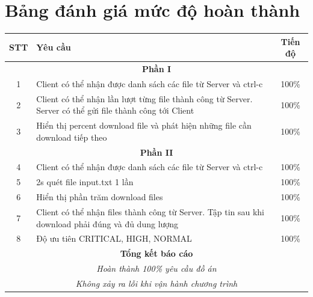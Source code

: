 \documentclass[a4paper,12pt]{report}
\begin{document}
\section{Bảng đánh giá mức độ hoàn thành}
\begin{center}
  \renewcommand{\arraystretch}{1.5}
  \begin{tabular}{|c|p{}|c|}
    \hline
    \textbf{STT} & \textbf{Yêu cầu}                                                                                         & \textbf{Tiến độ} \\\hline
    \multicolumn{3}{|c|}{\textbf{Phần I}}                                                                                                      \\\hline
    1            & Client có thể nhận được danh sách các file từ Server và ctrl-c                                           & 100\%            \\\hline
    2            & Client có thể nhận lần lượt từng file thành công từ Server. Server có thể gửi file thành công tới Client & 100\%            \\\hline
    3            & Hiển thị percent download file và phát hiện những file cần download tiếp theo                            & 100\%            \\\hline
    \multicolumn{3}{|c|}{\textbf{Phần II}}                                                                                                     \\\hline
    4            & Client có thể nhận được danh sách các file từ Server và ctrl-c                                           & 100\%            \\\hline
    5            & 2s quét file input.txt 1 lần                                                                             & 100\%            \\\hline
    6            & Hiển thị phần trăm download files                                                                        & 100\%            \\\hline
    7            & Client có thể nhận files thành công từ Server. Tập tin sau khi download phải đúng và đủ dung lượng       & 100\%            \\\hline
    8            & Độ ưu tiên CRITICAL, HIGH, NORMAL                                                                        & 100\%            \\\hline
    \multicolumn{3}{|c|}{\textbf{Tổng kết báo cáo}}                                                                                            \\
    \multicolumn{3}{|c|}{\textsl{Hoàn thành 100\% yêu cầu đồ án}}                                                                              \\
    \multicolumn{3}{|c|}{\textsl{Không xảy ra lỗi khi vận hành chương trình}}                                                                  \\\hline
  \end{tabular}
\end{center}
\end{document}
